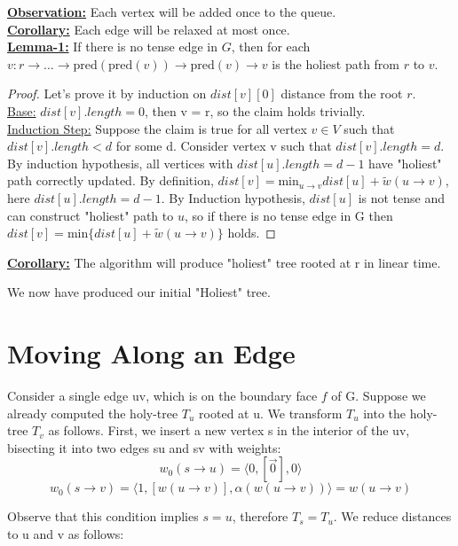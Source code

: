 \documentclass{article}
\begin{document}
\textbf{\underline{Observation:}} Each vertex will be added once to the queue. \\

\textbf{\underline{Corollary:}} Each edge will be relaxed at most once. \\

\textbf{\underline{Lemma-1:}} If there is no tense edge in $G$, then for each 
$v: r \rightarrow \ldots \rightarrow \text{pred}(\text{pred}(v)) \rightarrow 
\text{pred}(v) \rightarrow v$ is the holiest path from $r$ to $v$.

\begin{proof} Let's prove it by induction on $dist[v][0]$ distance from the root
$r$. \\
\underline{Base:} $dist[v].length = 0$, then v = r, so the claim holds trivially. \\
\underline{Induction Step:} Suppose the claim is true for all vertex $v \in V$ 
such that $dist[v].length < d$ for some d. Consider vertex v such that 
$dist[v].length=d$. By induction hypothesis, all vertices with 
$dist[u].length = d-1$ have "holiest" path 
correctly updated. By definition, $dist[v] = \text{min}_{u \rightarrow v}{
dist[u] + \tilde w(u \rightarrow v)}$, here $dist[u].length = d-1$. 
By Induction hypothesis, $dist[u]$ is not tense and can construct "holiest" 
path to $u$, so if there is no tense edge in G then 
$dist[v] = \text{min}\{dist[u] + \tilde w(u \rightarrow v)\}$ 
holds.
\end{proof}

\textbf{\underline{Corollary:}} The algorithm will produce "holiest" tree rooted at r in linear time.

We now have produced our initial "Holiest" tree.

\section{Moving Along an Edge}
Consider a single edge uv, which is on the boundary face $f$ of G. Suppose we
already computed the holy-tree $T_u$ rooted at u.  We transform $T_u$
into the holy-tree $T_v$ as follows. First, we insert a new vertex s in the
interior of the uv, bisecting it into two edges su and sv with weights:
\[ w_{0}(s \rightarrow u) = \langle 0, [\vec{0}], 0 \rangle \]
\[ w_{0}(s \rightarrow v) = \langle 1, [w(u \rightarrow v)], 
  \alpha(w(u \rightarrow v)) \rangle = w(u \rightarrow v)\]

Observe that this condition implies $s = u$, therefore $T_s = T_u$. We reduce 
distances to u and v as follows:
\end{document}
